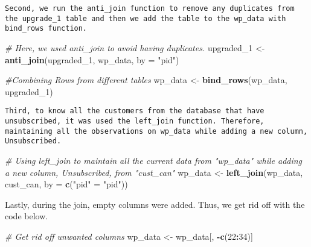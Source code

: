 \documentclass[]{article}
\newenvironment{Shaded}{\begin{snugshade}}{\end{snugshade}}
\newcommand{\KeywordTok}[1]{\textcolor[rgb]{0.13,0.29,0.53}{\textbf{#1}}}
\newcommand{\DataTypeTok}[1]{\textcolor[rgb]{0.13,0.29,0.53}{#1}}
\newcommand{\DecValTok}[1]{\textcolor[rgb]{0.00,0.00,0.81}{#1}}
\newcommand{\StringTok}[1]{\textcolor[rgb]{0.31,0.60,0.02}{#1}}
\newcommand{\CommentTok}[1]{\textcolor[rgb]{0.56,0.35,0.01}{\textit{#1}}}
\newcommand{\OperatorTok}[1]{\textcolor[rgb]{0.81,0.36,0.00}{\textbf{#1}}}
\newcommand{\NormalTok}[1]{#1}
\begin{document}
\begin{verbatim}
Second, we run the anti_join function to remove any duplicates from the upgrade_1 table and then we add the table to the wp_data with bind_rows function.
\end{verbatim}

\begin{Shaded}
\begin{Highlighting}[]
\CommentTok{# Here, we used anti_join to avoid having duplicates.}
\NormalTok{upgraded_}\DecValTok{1}\NormalTok{ <-}\StringTok{ }\KeywordTok{anti_join}\NormalTok{(upgraded_}\DecValTok{1}\NormalTok{, wp_data, }\DataTypeTok{by =} \StringTok{"pid"}\NormalTok{)}

\CommentTok{#Combining Rows from different tables}
\NormalTok{wp_data <-}\StringTok{ }\KeywordTok{bind_rows}\NormalTok{(wp_data, upgraded_}\DecValTok{1}\NormalTok{)}
\end{Highlighting}
\end{Shaded}

\begin{verbatim}
Third, to know all the customers from the database that have unsubscribed, it was used the left_join function. Therefore, maintaining all the observations on wp_data while adding a new column, Unsubscribed. 
\end{verbatim}

\begin{Shaded}
\begin{Highlighting}[]
\CommentTok{# Using left_join to maintain all the current data from "wp_data" while adding a new column, Unsubscribed, from "cust_can"}
\NormalTok{wp_data <-}\StringTok{ }\KeywordTok{left_join}\NormalTok{(wp_data, cust_can, }\DataTypeTok{by =} \KeywordTok{c}\NormalTok{(}\StringTok{"pid"}\NormalTok{ =}\StringTok{ "pid"}\NormalTok{))}
\end{Highlighting}
\end{Shaded}

Lastly, during the join, empty columns were added. Thus, we get rid off
with the code below.

\begin{Shaded}
\begin{Highlighting}[]
\CommentTok{# Get rid off unwanted columns}
\NormalTok{wp_data <-}\StringTok{ }\NormalTok{wp_data[, }\OperatorTok{-}\KeywordTok{c}\NormalTok{(}\DecValTok{22}\OperatorTok{:}\DecValTok{34}\NormalTok{)]}
\end{Highlighting}
\end{Shaded}
\end{document}
